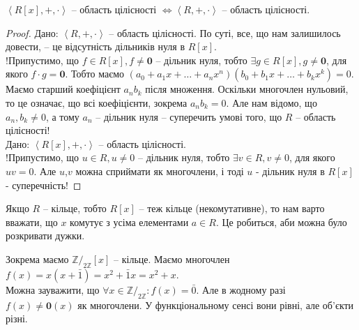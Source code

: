\documentclass{math_library}
\begin{document}
\begin{corollary}
$\left< R[x],+,\cdot\right>$ -- область цілісності $\iff \left< R,+,\cdot\right>$ -- область цілісності.
\end{corollary}

\begin{proof}
\leftproof Дано: $\left< R,+,\cdot\right>$ -- область цілісності. По суті, все, що нам залишилось довести, -- це відсутність дільників нуля в $R[x]$.\\
!Припустимо, що $f \in R[x], f \neq \textbf{0}$ -- дільник нуля, тобто $\exists g \in R[x], g \neq \textbf{0}$, для якого $f \cdot g = \textbf{0}$. Тобто маємо $(a_0+a_1 x + \dots + a_nx^n)(b_0 + b_1x + \dots + b_k x^k) = 0$. Маємо старший коефіцієнт $a_n b_k$ після множення. Оскільки многочлен нульовий, то це означає, що всі коефіцієнти, зокрема $a_n b_k = 0$. Але нам відомо, що $a_n,b_k \neq 0$, а тому $a_n$ -- дільник нуля -- суперечить умові того, що $R$ -- область цілісності!
\bigskip \\
\rightproof Дано: $\left< R[x], +, \cdot \right>$ -- область цілісності.\\
!Припустимо, що $u \in R, u \neq 0$ -- дільник нуля, тобто $\exists v \in R, v \neq 0$, для якого $uv = 0$. Але $u$,$v$ можна сприймати як многочлени, і тоді $u$ - дільник нуля в $R[x]$ - суперечність!
\end{proof}

\begin{remark}
Якщо $R$ -- кільце, тобто $R[x]$ -- теж кільце (некомутативне), то нам варто вважати, що $x$ комутує з усіма елементами $a \in R$. Це робиться, аби можна було розкривати дужки.
\end{remark}

\begin{example}
Зокрема маємо $\mathbb{Z}/_{2 \mathbb{Z}}[x]$ -- кільце. Маємо многочлен $f(x) = x(x+\bar{1}) = x^2 + \bar{1}x = x^2 + x$.\\
Можна зауважити, що $\forall x \in \mathbb{Z}/_{2 \mathbb{Z}}: f(x) = \bar{0}$. Але в жодному разі $f(x) \ne \textbf{0}(x)$ як многочлени. У функціональному сенсі вони рівні, але об'єкти різні.
\end{example}
\end{document}
